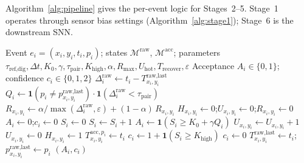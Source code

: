 \documentclass[a4paper,fleqn]{cas-dc}
\newcommand{\ind}[1]{\mathbf{1}\!\left(#1\right)}
\begin{document}
Algorithm~\ref{alg:pipeline} gives the per-event logic for Stages~2--5. Stage~1 operates through sensor bias settings (Algorithm~\ref{alg:stage1}); Stage~6 is the downstream SNN.

\begin{algorithm}[t]
\caption{Per-event processing for Stages~2--5}
\label{alg:pipeline}
\begin{algorithmic}[1]
\REQUIRE Event $e_i=(x_i,y_i,t_i,p_i)$; states $\mathcal{M}^{\text{raw}}$, $\mathcal{M}^{\text{acc}}$; parameters $\tau_{\text{ref,dig}}, \Delta t, K_0, \gamma, \tau_{\text{pair}}, K_{\text{high}}, \alpha, R_{\max}, U_{\text{hot}}, T_{\text{recover}}, \varepsilon$
\ENSURE Acceptance $A_i\in\{0,1\}$; confidence $c_i\in\{0,1,2\}$
\STATE $\Delta_i^{\text{raw}} \gets t_i - T_{x_i,y_i}^{\text{raw,last}}$
\STATE $Q_i \gets \ind{p_i \neq p_{x_i,y_i}^{\text{raw,last}}}\cdot\ind{\Delta_i^{\text{raw}} < \tau_{\text{pair}}}$
\STATE $R_{x_i,y_i} \gets \alpha/\max(\Delta_i^{\text{raw}}, \varepsilon) + (1-\alpha)\,R_{x_i,y_i}$
\STATE {}
    \STATE $H_{x_i,y_i} \gets 0$;\quad $U_{x_i,y_i} \gets 0$;\quad $R_{x_i,y_i} \gets 0$
\ENDIF
\STATE {}
    \STATE $A_i \gets 0$;\quad $c_i \gets 0$ 
\ELSE
    \STATE {}
    \STATE $S_i \gets 0$
            \STATE $S_i \gets S_i + 1$
        \ENDIF
    \ENDFOR
    \STATE {}
    \STATE $A_i \gets \ind{S_i \geq K_0 + \gamma Q_i}$
    \STATE {}
        \STATE $U_{x_i,y_i} \gets U_{x_i,y_i} + 1$
    \ELSE
        \STATE $U_{x_i,y_i} \gets 0$
    \ENDIF
        \STATE $H_{x_i,y_i} \gets 1$
    \ENDIF
    \STATE {}
        \STATE $T_{x_i,y_i}^{\text{acc},p_i} \gets t_i$
        \STATE $c_i \gets 1 + \ind{S_i \geq K_{\text{high}}}$
    \ELSE
        \STATE $c_i \gets 0$
    \ENDIF
\ENDIF
\STATE $T_{x_i,y_i}^{\text{raw,last}} \gets t_i$;\quad $p_{x_i,y_i}^{\text{raw,last}} \gets p_i$
\RETURN $(A_i,c_i)$
\end{algorithmic}
\end{algorithm}
\end{document}
